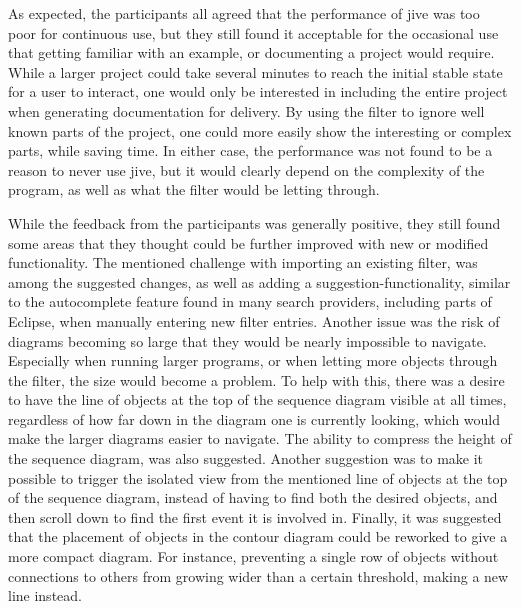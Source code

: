 As expected, the participants all agreed that the performance of \gls{jive} was too poor for continuous use, but they still found it acceptable for the occasional use that getting familiar with an example, or documenting a project would require.
While a larger project could take several minutes to reach the initial stable state for a user to interact, one would only be interested in including the entire project when generating documentation for delivery.
By using the filter to ignore well known parts of the project, one could more easily show the interesting or complex parts, while saving time.
In either case, the performance was not found to be a reason to never use \gls{jive}, but it would clearly depend on the complexity of the program, as well as what the filter would be letting through.

While the feedback from the participants was generally positive, they still found some areas that they thought could be further improved with new or modified functionality.
The mentioned challenge with importing an existing filter, was among the suggested changes, as well as adding a suggestion-functionality, similar to the autocomplete feature found in many search providers, including parts of Eclipse, when manually entering new filter entries.
Another issue was the risk of diagrams becoming so large that they would be nearly impossible to navigate.
Especially when running larger programs, or when letting more objects through the filter, the size would become a problem.
To help with this, there was a desire to have the line of objects at the top of the sequence diagram visible at all times, regardless of how far down in the diagram one is currently looking, which would make the larger diagrams easier to navigate.
The ability to compress the height of the sequence diagram, was also suggested.
Another suggestion was to make it possible to trigger the isolated view from the mentioned line of objects at the top of the sequence diagram, instead of having to find both the desired objects, and then scroll down to find the first event it is involved in.
Finally, it was suggested that the placement of objects in the contour diagram could be reworked to give a more compact diagram.
For instance, preventing a single row of objects without connections to others from growing wider than a certain threshold, making a new line instead.
